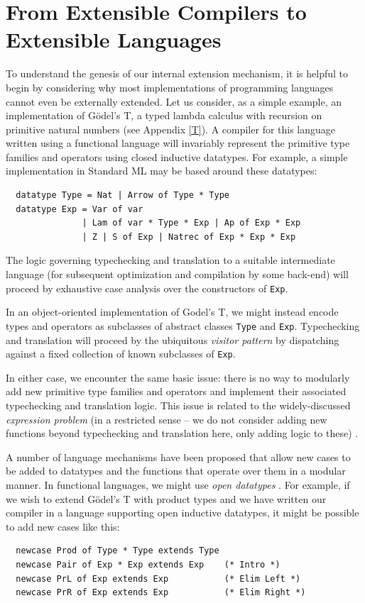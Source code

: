 \documentclass{llncs}
\begin{document}
\section{From Extensible Compilers to Extensible Languages}\label{evolution}
To understand the genesis of our internal extension mechanism, it is helpful to begin by considering why most implementations of programming languages cannot even be  externally extended. 
Let us consider, as a simple example, an implementation of G\"odel's T, a typed lambda calculus with recursion on primitive natural numbers (see Appendix \ref{T}). 
A compiler for this language written using a functional language will invariably represent the primitive type families and operators using {closed} inductive datatypes. 
For example, a simple implementation in Standard ML may be based around these datatypes:
\begin{lstlisting}
  datatype Type = Nat | Arrow of Type * Type
  datatype Exp = Var of var 
               | Lam of var * Type * Exp | Ap of Exp * Exp 
               | Z | S of Exp | Natrec of Exp * Exp * Exp
\end{lstlisting}

The logic governing typechecking and translation to a suitable intermediate language (for subsequent optimization and compilation by some back-end) will proceed by exhaustive case analysis over the constructors of \lstinline{Exp}.

In an object-oriented implementation of Godel's T, we might instead encode types and operators as subclasses of abstract classes \lstinline{Type} and \lstinline{Exp}. Typechecking and translation will proceed by the ubiquitous \emph{visitor pattern} \cite{visitor} by dispatching against a fixed collection of {known} subclasses of \lstinline{Exp}. 

In either case, we encounter the same basic issue: there is no way to modularly add new primitive type families and operators and implement their associated typechecking and translation logic. 
This issue is related to the widely-discussed \emph{expression problem} (in a restricted sense -- we do not consider adding new functions beyond typechecking and translation here, only adding logic to these) \cite{wadler-expression}.

A number of language mechanisms have been proposed that allow new cases to be added to datatypes and the functions that operate over them in a modular manner. 
In functional languages, we might use \emph{open datatypes} \cite{open-datatypes}. For example, if we wish to extend G\"odel's T with product types and we have written our compiler in a language supporting open inductive datatypes, it might be possible to add new cases like this: 
\begin{lstlisting}
  newcase Prod of Type * Type extends Type
  newcase Pair of Exp * Exp extends Exp    (* Intro *)
  newcase PrL of Exp extends Exp           (* Elim Left *)
  newcase PrR of Exp extends Exp           (* Elim Right *)
\end{lstlisting}
\end{document}
